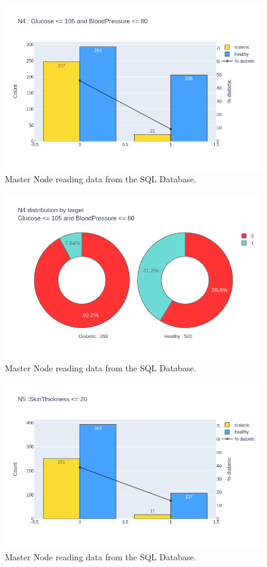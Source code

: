 \documentclass[12pt]{article}
\begin{document}
\begin{figure}[ht]
\centering
\includegraphics[width=1\textwidth]{newplot(21).png}
\caption{Master Node reading data from the SQL Database.}
\end{figure}

\begin{figure}[ht]
\centering
\includegraphics[width=1\textwidth]{newplot(22).png}
\caption{Master Node reading data from the SQL Database.}
\end{figure}

\begin{figure}[ht]
\centering
\includegraphics[width=1\textwidth]{newplot(23).png}
\caption{Master Node reading data from the SQL Database.}
\end{figure}
\end{document}
